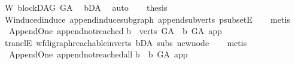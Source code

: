 \begin{isabellebody}
\ W{\isacharcolon}{\kern0pt}\ blockDAG\ {\isachardoublequoteopen}G{\isacharunderscore}{\kern0pt}A{\isachardoublequoteclose}\ \isamarkupfalse%
\ bD{\isacharunderscore}{\kern0pt}A\ \isamarkupfalse%
\ auto\isanewline
\ \ \isamarkupfalse%
\ {\isacharquery}{\kern0pt}thesis\isanewline
\ \ \isamarkupfalse%
\ W{\isachardot}{\kern0pt}induced{\isacharunderscore}{\kern0pt}induce\ append{\isacharunderscore}{\kern0pt}induce{\isacharunderscore}{\kern0pt}subgraph\ append{\isacharunderscore}{\kern0pt}subverts\ psubsetE\isanewline
\ \ \isamarkupfalse%
\ {\isacharparenleft}{\kern0pt}metis{\isacharparenright}{\kern0pt}\ \isanewline
{}\isamarkupfalse%
%
\endisatagproof
{\isafoldproof}%
%
\isadelimproof
\isanewline
%
\endisadelimproof
\isanewline
\isanewline
{}\isamarkupfalse%
\ {\isacharparenleft}{\kern0pt}\ Append{\isacharunderscore}{\kern0pt}One{\isacharparenright}{\kern0pt}\ append{\isacharunderscore}{\kern0pt}not{\isacharunderscore}{\kern0pt}reached{\isacharcolon}{\kern0pt}\isanewline
{\isachardoublequoteopen}{\isasymforall}b\ {\isasymin}\ verts\ G{\isacharunderscore}{\kern0pt}A{\isachardot}{\kern0pt}\ {\isasymnot}\ b\ {\isasymrightarrow}\isactrlsup {\isacharplus}{\kern0pt}\isactrlbsub G{\isacharunderscore}{\kern0pt}A\isactrlesub \ app{\isachardoublequoteclose}\isanewline
%
\isadelimproof
\ \ %
\endisadelimproof
%
\isatagproof
{}\isamarkupfalse%
\ tranclE\ wf{\isacharunderscore}{\kern0pt}digraph{\isachardot}{\kern0pt}reachable{}{\isacharunderscore}{\kern0pt}in{\isacharunderscore}{\kern0pt}verts{\isacharparenleft}{\kern0pt}{}{\isacharparenright}{\kern0pt}\ bD{\isacharunderscore}{\kern0pt}A\ subs\ new{\isacharunderscore}{\kern0pt}node\isanewline
\ \ \isamarkupfalse%
\ metis%
\endisatagproof
{\isafoldproof}%
%
\isadelimproof
\ \ \isanewline
%
\endisadelimproof
\isanewline
\isanewline
{}\isamarkupfalse%
\ {\isacharparenleft}{\kern0pt}\ Append{\isacharunderscore}{\kern0pt}One{\isacharparenright}{\kern0pt}\ append{\isacharunderscore}{\kern0pt}not{\isacharunderscore}{\kern0pt}reached{\isacharunderscore}{\kern0pt}all{\isacharcolon}{\kern0pt}\isanewline
{\isachardoublequoteopen}{\isasymforall}b{\isachardot}{\kern0pt}\ {\isasymnot}\ b\ {\isasymrightarrow}\isactrlsup {\isacharplus}{\kern0pt}\isactrlbsub G{\isacharunderscore}{\kern0pt}A\isactrlesub \ app{\isachardoublequoteclose}\isanewline
%
\isadelimproof
\ \ %
\endisadelimproof
%
\isatagproof
{}\isamarkupfalse%

\end{isabellebody}

